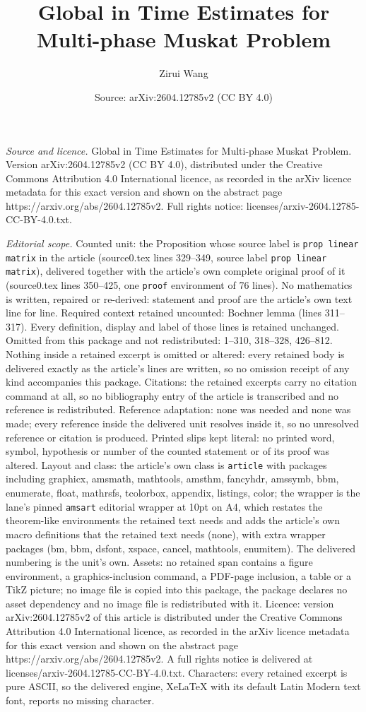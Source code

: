 \documentclass[10pt,a4paper]{amsart}
\title[Global in Time Estimates for Multi-phase Muskat Problem]{Global in Time Estimates for Multi-phase Muskat Problem}
\author{Zirui Wang}
\date{Source: arXiv:2604.12785v2 (CC BY 4.0)}
\begin{document}
\maketitle

\noindent\emph{Source and licence.} Global in Time Estimates for Multi-phase Muskat Problem. Version arXiv:2604.12785v2 (CC BY 4.0), distributed under the Creative Commons Attribution 4.0 International licence, as recorded in the arXiv licence metadata for this exact version and shown on the abstract page https://arxiv.org/abs/2604.12785v2. Full rights notice: licenses/arxiv-2604.12785-CC-BY-4.0.txt.\par\smallskip

\noindent\textit{Editorial scope.} Counted unit: the Proposition whose source label is \texttt{prop linear matrix} in the article (source0.tex lines 329--349, source label \texttt{prop linear matrix}), delivered together with the article's own complete original proof of it (source0.tex lines 350--425, one \texttt{proof} environment of 76 lines). No mathematics is written, repaired or re-derived: statement and proof are the article's own text line for line. Required context retained uncounted: Bochner lemma (lines 311--317). Every definition, display and label of those lines is retained unchanged. Omitted from this package and not redistributed: 1--310, 318--328, 426--812. Nothing inside a retained excerpt is omitted or altered: every retained body is delivered exactly as the article's lines are written, so no omission receipt of any kind accompanies this package. Citations: the retained excerpts carry no citation command at all, so no bibliography entry of the article is transcribed and no reference is redistributed. Reference adaptation: none was needed and none was made; every reference inside the delivered unit resolves inside it, so no unresolved reference or citation is produced. Printed slips kept literal: no printed word, symbol, hypothesis or number of the counted statement or of its proof was altered. Layout and class: the article's own class is \texttt{article} with packages including graphicx, amsmath, mathtools, amsthm, fancyhdr, amssymb, bbm, enumerate, float, mathrsfs, tcolorbox, appendix, listings, color; the wrapper is the lane's pinned \texttt{amsart} editorial wrapper at 10pt on A4, which restates the theorem-like environments the retained text needs and adds the article's own macro definitions that the retained text needs (none), with extra wrapper packages (bm, bbm, dsfont, xspace, cancel, mathtools, enumitem). The delivered numbering is the unit's own. Assets: no retained span contains a figure environment, a graphics-inclusion command, a PDF-page inclusion, a table or a TikZ picture; no image file is copied into this package, the package declares no asset dependency and no image file is redistributed with it. Licence: version arXiv:2604.12785v2 of this article is distributed under the Creative Commons Attribution 4.0 International licence, as recorded in the arXiv licence metadata for this exact version and shown on the abstract page https://arxiv.org/abs/2604.12785v2. A full rights notice is delivered at licenses/arxiv-2604.12785-CC-BY-4.0.txt. Characters: every retained excerpt is pure ASCII, so the delivered engine, XeLaTeX with its default Latin Modern text font, reports no missing character.
\end{document}
